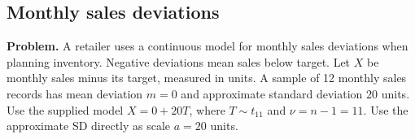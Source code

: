 
\clearpage
\subsection{Monthly sales deviations}
\label{c8-d4}
\textbf{Problem.} A retailer uses a continuous model for monthly sales deviations when planning inventory. Negative deviations mean sales below target. Let $X$ be monthly sales minus its target, measured in units. A sample of 12 monthly sales records has mean deviation $m=0$ and approximate standard deviation $20$ units. Use the supplied model $X=0+20T$, where $T\sim t_{11}$ and $\nu=n-1=11$. Use the approximate SD directly as scale $a=20$ units.

